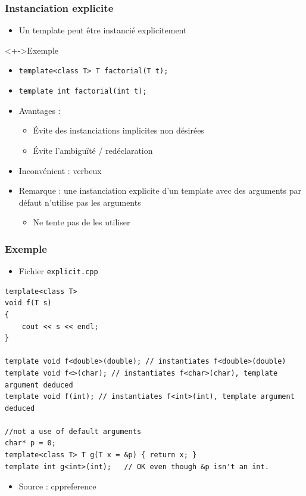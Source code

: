 \begin{frame}
\frametitle{Instanciation explicite}
\begin{itemize}[<+->]
\item Un template peut être instancié explicitement
\end{itemize}
\begin{exampleblock}<+->{Exemple}
	\begin{itemize}[<+->]
	\item \lstinline|template<class T> T factorial(T t);|
	\item \lstinline|template int factorial(int t);|
	\end{itemize}
\end{exampleblock}
\begin{itemize}[<+->]
\item Avantages :
	\begin{itemize}
	\item Évite des instanciations implicites non désirées
	\item Évite l'ambiguïté / redéclaration
	\end{itemize}
\item Inconvénient : verbeux
\item Remarque : une instanciation explicite d'un template avec des arguments par défaut n'utilise pas les arguments
	\begin{itemize}
	\item Ne tente pas de les utiliser
	\end{itemize}
\end{itemize}
\end{frame}

\begin{frame}[containsverbatim]
\frametitle{Exemple}
\begin{itemize}
\item Fichier \texttt{explicit.cpp}
\end{itemize}
\begin{lstlisting}
template<class T>
void f(T s)
{
    cout << s << endl;
}
 
template void f<double>(double); // instantiates f<double>(double)
template void f<>(char); // instantiates f<char>(char), template argument deduced
template void f(int); // instantiates f<int>(int), template argument deduced

//not a use of default arguments
char* p = 0;
template<class T> T g(T x = &p) { return x; }
template int g<int>(int);   // OK even though &p isn't an int.
\end{lstlisting}
\begin{itemize}
\item Source : cppreference
\end{itemize}
\end{frame}

